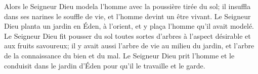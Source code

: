 Alors le Seigneur Dieu modela l’homme avec la poussière tirée du sol;
	il insuffla dans ses narines le souffle de vie,
	et l’homme devint un être vivant.
Le Seigneur Dieu planta un jardin en Éden, à l’orient,
	et y plaça l’homme qu’il avait modelé.
Le Seigneur Dieu fit pousser du sol toutes sortes d’arbres
	à l’aspect désirable et aux fruits savoureux;
	il y avait aussi l’arbre de vie au milieu du jardin,
	et l’arbre de la connaissance du bien et du mal.
Le Seigneur Dieu prit l’homme et le conduisit dans le jardin d’Éden
	pour qu’il le travaille et le garde.
